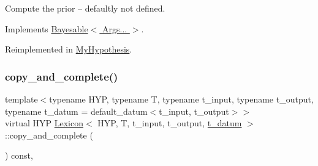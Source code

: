 Compute the prior -- defaultly not defined. 



Implements \hyperlink{class_bayesable_a9aa752f0adff1b95f8957b91fc928649}{Bayesable$<$ Args... $>$}.



Reimplemented in \hyperlink{class_my_hypothesis_ab092094c5fc31730de4f40609220bb18}{My\+Hypothesis}.

\mbox{\label{class_lexicon_a52a6e819264e04584320adca868aec4a}} 
\subsubsection{\texorpdfstring{copy\+\_\+and\+\_\+complete()}{copy\_and\_complete()}}
{\footnotesize\ttfamily template$<$typename H\+YP, typename T, typename t\+\_\+input, typename t\+\_\+output, typename t\+\_\+datum = default\+\_\+datum$<$t\+\_\+input, t\+\_\+output$>$$>$ \\
virtual H\+YP \hyperlink{class_lexicon}{Lexicon}$<$ H\+YP, T, t\+\_\+input, t\+\_\+output, \hyperlink{class_bayesable_a7c93a2eeab708378eb321745908718d4}{t\+\_\+datum} $>$\+::copy\+\_\+and\+\_\+complete (\begin{DoxyParamCaption}{ }\end{DoxyParamCaption}) const\hspace{0.3cm}{\ttfamily [inline]}, {\ttfamily [virtual]}}

\mbox{\label{class_lexicon_a4aad4c15b3193acf498e24a206533e86}} 
